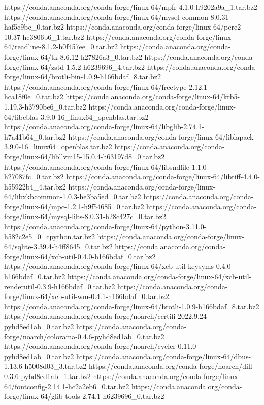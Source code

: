 https://conda.anaconda.org/conda-forge/linux-64/mpfr-4.1.0-h9202a9a_1.tar.bz2
https://conda.anaconda.org/conda-forge/linux-64/mysql-common-8.0.31-haf5c9bc_0.tar.bz2
https://conda.anaconda.org/conda-forge/linux-64/pcre2-10.37-hc3806b6_1.tar.bz2
https://conda.anaconda.org/conda-forge/linux-64/readline-8.1.2-h0f457ee_0.tar.bz2
https://conda.anaconda.org/conda-forge/linux-64/tk-8.6.12-h27826a3_0.tar.bz2
https://conda.anaconda.org/conda-forge/linux-64/zstd-1.5.2-h6239696_4.tar.bz2
https://conda.anaconda.org/conda-forge/linux-64/brotli-bin-1.0.9-h166bdaf_8.tar.bz2
https://conda.anaconda.org/conda-forge/linux-64/freetype-2.12.1-hca18f0e_0.tar.bz2
https://conda.anaconda.org/conda-forge/linux-64/krb5-1.19.3-h3790be6_0.tar.bz2
https://conda.anaconda.org/conda-forge/linux-64/libcblas-3.9.0-16_linux64_openblas.tar.bz2
https://conda.anaconda.org/conda-forge/linux-64/libglib-2.74.1-h7a41b64_0.tar.bz2
https://conda.anaconda.org/conda-forge/linux-64/liblapack-3.9.0-16_linux64_openblas.tar.bz2
https://conda.anaconda.org/conda-forge/linux-64/libllvm15-15.0.4-h63197d8_0.tar.bz2
https://conda.anaconda.org/conda-forge/linux-64/libsndfile-1.1.0-h27087fc_0.tar.bz2
https://conda.anaconda.org/conda-forge/linux-64/libtiff-4.4.0-h55922b4_4.tar.bz2
https://conda.anaconda.org/conda-forge/linux-64/libxkbcommon-1.0.3-he3ba5ed_0.tar.bz2
https://conda.anaconda.org/conda-forge/linux-64/mpc-1.2.1-h9f54685_0.tar.bz2
https://conda.anaconda.org/conda-forge/linux-64/mysql-libs-8.0.31-h28c427c_0.tar.bz2
https://conda.anaconda.org/conda-forge/linux-64/python-3.11.0-h582c2e5_0_cpython.tar.bz2
https://conda.anaconda.org/conda-forge/linux-64/sqlite-3.39.4-h4ff8645_0.tar.bz2
https://conda.anaconda.org/conda-forge/linux-64/xcb-util-0.4.0-h166bdaf_0.tar.bz2
https://conda.anaconda.org/conda-forge/linux-64/xcb-util-keysyms-0.4.0-h166bdaf_0.tar.bz2
https://conda.anaconda.org/conda-forge/linux-64/xcb-util-renderutil-0.3.9-h166bdaf_0.tar.bz2
https://conda.anaconda.org/conda-forge/linux-64/xcb-util-wm-0.4.1-h166bdaf_0.tar.bz2
https://conda.anaconda.org/conda-forge/linux-64/brotli-1.0.9-h166bdaf_8.tar.bz2
https://conda.anaconda.org/conda-forge/noarch/certifi-2022.9.24-pyhd8ed1ab_0.tar.bz2
https://conda.anaconda.org/conda-forge/noarch/colorama-0.4.6-pyhd8ed1ab_0.tar.bz2
https://conda.anaconda.org/conda-forge/noarch/cycler-0.11.0-pyhd8ed1ab_0.tar.bz2
https://conda.anaconda.org/conda-forge/linux-64/dbus-1.13.6-h5008d03_3.tar.bz2
https://conda.anaconda.org/conda-forge/noarch/dill-0.3.6-pyhd8ed1ab_1.tar.bz2
https://conda.anaconda.org/conda-forge/linux-64/fontconfig-2.14.1-hc2a2eb6_0.tar.bz2
https://conda.anaconda.org/conda-forge/linux-64/glib-tools-2.74.1-h6239696_0.tar.bz2
